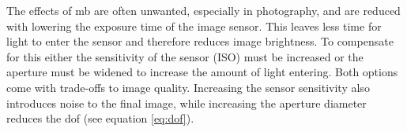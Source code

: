 The effects of \gls{mb} are often unwanted, especially in photography, and are reduced with lowering the exposure time of the image sensor.
This leaves less time for light to enter the sensor and therefore reduces image brightness.
To compensate for this either the sensitivity of the sensor (ISO) must be increased or the aperture must be widened to increase the amount of light entering.
Both options come with trade-offs to image quality.
Increasing the sensor sensitivity also introduces noise to the final image, while increasing the aperture diameter reduces the \gls{dof} (see equation \ref{eq:dof}).

